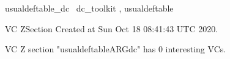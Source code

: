 \documentclass{article}
\begin{document}

\begin{zsection}	 \SECTION usualdeftable\_dc \parents~dc\_toolkit , usualdeftable
\end{zsection}

\newcommand{\appliesTo}{\zbinop{appliesTo}} 
\newcommand{\appliesToNofix}{\zpreop{appliesToNofix}} 

VC ZSection Created at Sun Oct 18 08:41:43 UTC 2020.



 VC Z section "usualdeftableARGdc" has $0$ interesting VCs.



\end{document}
